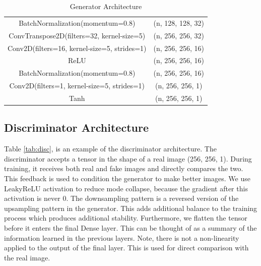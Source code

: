 \begin{center}
\begin{table}[H]
\begin{tabular}{c|c}
            BatchNormalization(momentum=0.8) & (n, 128, 128, 32)\\
            ConvTranspose2D(filters=32, kernel-size=5) & (n, 256, 256, 32)\\
            Conv2D(filters=16, kernel-size=5, strides=1)       & (n, 256, 256, 16)\\
            ReLU         & (n, 256, 256, 16)\\
            BatchNormalization(momentum=0.8) & (n, 256, 256, 16)\\
            Conv2D(filters=1, kernel-size=5, strides=1)       & (n, 256, 256, 1)\\
            Tanh         & (n, 256, 256, 1)\\
        \end{tabular}
        \caption{Generator Architecture}
        \label{tab:gen}
    \end{table}
\end{center}


\subsection{Discriminator Architecture}
Table \ref{tab:disc}, is an example of the discriminator architecture. The discriminator accepts a tensor in the shape of a real image (256, 256, 1). During training, it receives both real and fake images and directly compares the two. This feedback is used to condition the generator to make better images. We use LeakyReLU\cite{leaky_relu} activation to reduce mode collapse, because the gradient after this activation is never 0. The downsampling pattern is a reversed version of the upsampling pattern in the generator. This adds additional balance to the training process which produces additional stability. Furthermore, we flatten the tensor before it enters the final Dense layer. This can be thought of as a summary of the information learned in the previous layers. Note, there is not a non-linearity applied to the output of the final layer. This is used for direct comparison with the real image. 

